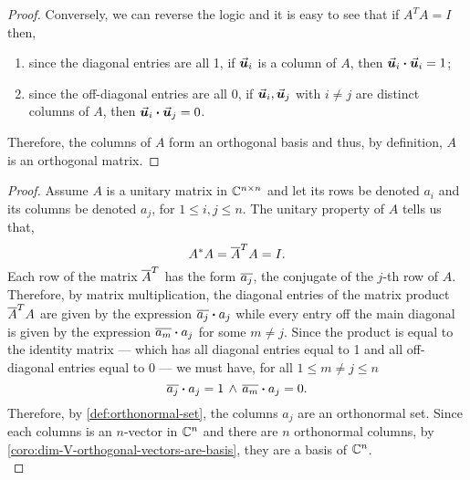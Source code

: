 \documentclass[../MathsNotesBase.tex]{subfiles}
\begin{document}
{\begin{proof}
			Conversely, we can reverse the logic and it is easy to see that if ${ A^T A = I }$ then,
			\begin{enumerate}[label=(\roman*)]
				\item{since the diagonal entries are all 1, if $\vec{\bm{u}}_i$ is a column of $A$, then ${ \vec{\bm{u}}_i \boldsymbol{\cdot} \vec{\bm{u}}_i = 1 }$;}
				\item{since the off-diagonal entries are all 0, if ${ \vec{\bm{u}}_i, \vec{\bm{u}}_j }$ with ${ i \neq j }$ are distinct columns of $A$, then  ${ \vec{\bm{u}}_i \boldsymbol{\cdot} \vec{\bm{u}}_j = 0 }$.}
			\end{enumerate}
			Therefore, the columns of $A$ form an orthogonal basis and thus, by definition, $A$ is an orthogonal matrix.
		\end{proof}
		
	
		\bigskip
		\begin{proof}
			Assume $A$ is a unitary matrix in  $\mathbb{C}^{n \times n}$ and let its rows be denoted $a_i$ and its columns be denoted $a_j$, for ${ 1 \leq i,j \leq n }$. The unitary property of $A$ tells us that,
			\[ A^* A = \overline{A}^T A = I. \]
			Each row of the matrix $\overline{A}^T$ has the form $\overline{a_j}$, the conjugate of the $j$-th row of $A$. Therefore, by matrix multiplication, the diagonal entries of the matrix product $\overline{A}^T A$ are given by the expression ${ \overline{a_j} \boldsymbol{\cdot} a_j }$ while every entry off the main diagonal is given by the expression ${ \overline{a_m} \boldsymbol{\cdot} a_j }$ for some ${ m \neq j }$. Since the product is equal to the identity matrix --- which has all diagonal entries equal to 1 and all off-diagonal entries equal to 0 --- we must have, for all ${ 1 \leq m \neq j \leq n }$
			\[ \overline{a_j} \boldsymbol{\cdot} a_j = 1 \, \land \, \overline{a_m} \boldsymbol{\cdot} a_j = 0. \]
			Therefore, by \ref{def:orthonormal-set}, the columns $a_j$ are an orthonormal set. Since each columns is an $n$-vector in $\mathbb{C}^{n}$ and there are $n$ orthonormal columns, by \ref{coro:dim-V-orthogonal-vectors-are-basis}, they are a basis of $\mathbb{C}^{n}$.\\
			

\end{proof}}
\end{document}
